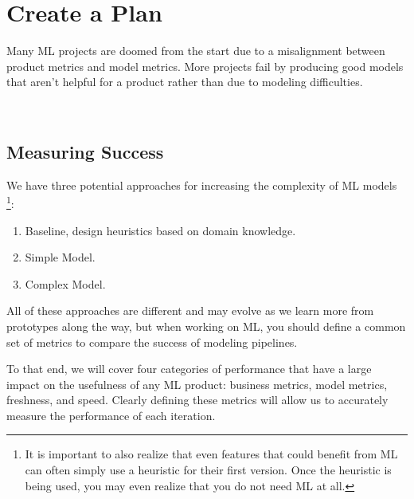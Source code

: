 \section{Create a Plan}
Many ML projects are doomed from the start due to a misalignment between product
metrics and model metrics. More projects fail by producing good models that
aren't helpful for a product rather than due to modeling difficulties.

\

\subsection{Measuring Success}
We have three potential approaches for increasing the complexity of ML models
\footnote{
    It is important to also realize that even features that could benefit from
    ML can often simply use a heuristic for their first version. Once the
    heuristic is being used, you may even realize that you do not need ML at all.
}:
\begin{enumerate}
    \item[1.] Baseline, design heuristics based on domain knowledge.
    \item[2.] Simple Model. 
    \item[3.] Complex Model.
\end{enumerate} 
All of these approaches are different and may evolve as we learn more from
prototypes along the way, but when working on ML, you should define a common
set of metrics to compare the success of modeling pipelines.

To that end, we will cover four categories of performance that have a
large impact on the usefulness of any ML product: business metrics,
model metrics, freshness, and speed. Clearly defining these metrics will
allow us to accurately measure the performance of each iteration.


